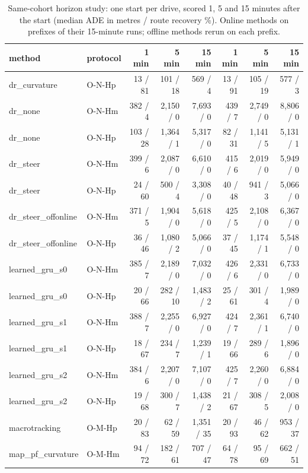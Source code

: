 \begin{table}[t]\centering\scriptsize\setlength{\tabcolsep}{3pt}
\caption{Same-cohort horizon study: one start per drive, scored 1, 5 and 15 minutes after the start (median ADE in metres / route recovery \%). Online methods on prefixes of their 15-minute runs; offline methods rerun on each prefix.}\label{tab:supp_cohort}
\begin{tabular}{llrrrrrr}\toprule
method & protocol & 1 min & 5 min & 15 min & 1 min & 5 min & 15 min \\\midrule
dr\_curvature & O-N-Hp & 13 / 81 & 101 / 18 & 569 / 4 & 13 / 91 & 105 / 19 & 577 / 3 \\
dr\_none & O-N-Hm & 382 / 4 & 2{,}150 / 0 & 7{,}693 / 0 & 439 / 7 & 2{,}749 / 0 & 8{,}806 / 0 \\
dr\_none & O-N-Hp & 103 / 28 & 1{,}364 / 1 & 5{,}317 / 0 & 82 / 31 & 1{,}141 / 5 & 5{,}131 / 1 \\
dr\_steer & O-N-Hm & 399 / 6 & 2{,}087 / 0 & 6{,}610 / 0 & 415 / 6 & 2{,}019 / 0 & 5{,}949 / 0 \\
dr\_steer & O-N-Hp & 24 / 60 & 500 / 4 & 3{,}308 / 0 & 40 / 48 & 941 / 3 & 5{,}066 / 0 \\
dr\_steer\_offonline & O-N-Hm & 371 / 5 & 1{,}904 / 0 & 5{,}618 / 0 & 425 / 5 & 2{,}108 / 0 & 6{,}367 / 0 \\
dr\_steer\_offonline & O-N-Hp & 36 / 46 & 1{,}080 / 2 & 5{,}066 / 0 & 37 / 45 & 1{,}174 / 1 & 5{,}548 / 0 \\
learned\_gru\_s0 & O-N-Hm & 385 / 7 & 2{,}189 / 0 & 7{,}032 / 0 & 426 / 6 & 2{,}331 / 0 & 6{,}733 / 0 \\
learned\_gru\_s0 & O-N-Hp & 20 / 66 & 282 / 10 & 1{,}483 / 2 & 25 / 61 & 301 / 4 & 1{,}989 / 0 \\
learned\_gru\_s1 & O-N-Hm & 388 / 7 & 2{,}255 / 0 & 6{,}927 / 0 & 424 / 7 & 2{,}361 / 1 & 6{,}740 / 0 \\
learned\_gru\_s1 & O-N-Hp & 18 / 67 & 234 / 7 & 1{,}239 / 1 & 19 / 66 & 289 / 6 & 1{,}896 / 0 \\
learned\_gru\_s2 & O-N-Hm & 384 / 6 & 2{,}207 / 0 & 7{,}107 / 0 & 425 / 7 & 2{,}260 / 0 & 6{,}884 / 0 \\
learned\_gru\_s2 & O-N-Hp & 19 / 68 & 300 / 7 & 1{,}438 / 2 & 21 / 67 & 308 / 5 & 2{,}008 / 0 \\
macrotracking & O-M-Hp & 20 / 83 & 62 / 59 & 1{,}351 / 35 & 20 / 93 & 46 / 62 & 953 / 37 \\
map\_pf\_curvature & O-M-Hm & 94 / 72 & 182 / 61 & 707 / 47 & 64 / 78 & 95 / 69 & 662 / 51 \\

\end{tabular}
\end{table}

